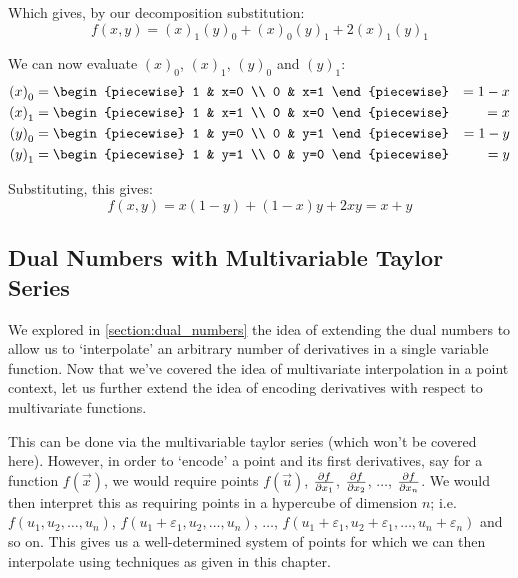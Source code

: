 \begin{example}
    Which gives, by our decomposition substitution:
    $$
        f(x,y)={(x)}_{1}{(y)}_{0}+{(x)}_{0}{(y)}_{1}+2{(x)}_{1}{(y)}_{1}
    $$

    We can now evaluate ${(x)}_0$, ${(x)}_1$, ${(y)}_0$ and ${(y)}_1$:
    \begin{align*}
        {(x)}_0 &= \begin{piecewise}
            1 & x=0 \\
            0 & x=1
        \end{piecewise} &= 1-x \\
        {(x)}_1 &= \begin{piecewise}
            1 & x=1 \\
            0 & x=0
        \end{piecewise} &= x \\
        {(y)}_0 &= \begin{piecewise}
            1 & y=0 \\
            0 & y=1
        \end{piecewise} &= 1-y \\
        {(y)}_1 &= \begin{piecewise}
            1 & y=1 \\
            0 & y=0
        \end{piecewise} &= y \\
    \end{align*}

    Substituting, this gives:
    $$
        f(x,y)=x(1-y)+(1-x)y+2xy=x+y
    $$
\end{example}

\subsection{Dual Numbers with Multivariable Taylor Series}
We explored in \ref{section:dual_numbers} the idea of extending the dual numbers to allow us to `interpolate' an arbitrary number of derivatives in a single variable function. Now that we've covered the idea of multivariate interpolation in a point context, let us further extend the idea of encoding derivatives with respect to multivariate functions.

This can be done via the multivariable taylor series (which won't be covered here). However, in order to `encode' a point and its first derivatives, say for a function $f(\vec{x})$, we would require points $f(\vec{u})$, $\pdv{f}{x_1} (\vec{u})$, $\pdv{f}{x_2} (\vec{u})$, $\dots$, $\pdv{f}{x_n} (\vec{u})$. We would then interpret this as requiring points in a hypercube of dimension $n$; i.e. $f(u_1,u_2,\dots,u_n)$, $f(u_1+\varepsilon_1,u_2,\dots,u_n)$, $\dots$, $f(u_1+\varepsilon_1,u_2+\varepsilon_1,\dots,u_n+\varepsilon_n)$ and so on. This gives us a well-determined system of points for which we can then interpolate using techniques as given in this chapter.


\newpage